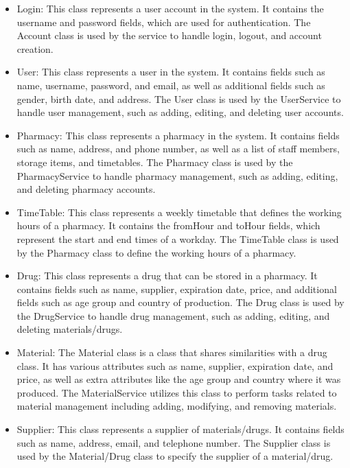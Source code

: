 \begin{itemize}
\item Login: This class represents a user account in the system. It contains the username and password fields, which are used for authentication. The Account class is used by the service to handle login, logout, and account creation.

\item User: This class represents a user in the system. It contains fields such as name, username, password, and email, as well as additional fields such as gender, birth date, and address. The User class is used by the UserService to handle user management, such as adding, editing, and deleting user accounts.
\item Pharmacy: This class represents a pharmacy in the system. It contains fields such as name, address, and phone number, as well as a list of staff members, storage items, and timetables. The Pharmacy class is used by the PharmacyService to handle pharmacy management, such as adding, editing, and deleting pharmacy accounts.

\item TimeTable: This class represents a weekly timetable that defines the working hours of a pharmacy. It contains the fromHour and toHour fields, which represent the start and end times of a workday. The TimeTable class is used by the Pharmacy class to define the working hours of a pharmacy.

\item Drug: This class represents a  drug that can be stored in a pharmacy. It contains fields such as name, supplier, expiration date, price, and additional fields such as age group and country of production. The Drug class is used by the DrugService to handle drug management, such as adding, editing, and deleting materials/drugs.

\item Material: The Material class is a class that shares similarities with a drug class. It has various attributes such as name, supplier, expiration date, and price, as well as extra attributes like the age group and country where it was produced. The MaterialService utilizes this class to perform tasks related to material management including adding, modifying, and removing materials.

\item Supplier: This class represents a supplier of materials/drugs. It contains fields such as name, address, email, and telephone number. The Supplier class is used by the Material/Drug class to specify the supplier of a material/drug.


\end{itemize}
